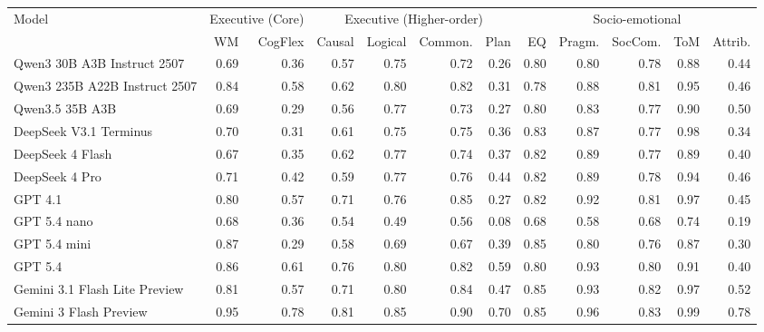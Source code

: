 \begin{tabular}{l r r r r r r r r r r r}
\toprule
\multirow{2}{*}{Model} & \multicolumn{2}{c}{Executive (Core)} & \multicolumn{4}{c}{Executive (Higher-order)} & \multicolumn{5}{c}{Socio-emotional} \\
\cmidrule(lr){2-3}\cmidrule(lr){4-7}\cmidrule(l){8-12}
 & WM & CogFlex & Causal & Logical & Common. & Plan & EQ & Pragm. & SocCom. & ToM & Attrib. \\
\midrule
Qwen3 30B A3B Instruct 2507 & 0.69 & 0.36 & 0.57 & 0.75 & 0.72 & 0.26 & 0.80 & 0.80 & 0.78 & 0.88 & 0.44 \\
Qwen3 235B A22B Instruct 2507 & 0.84 & 0.58 & 0.62 & 0.80 & 0.82 & 0.31 & 0.78 & 0.88 & 0.81 & 0.95 & 0.46 \\
Qwen3.5 35B A3B & 0.69 & 0.29 & 0.56 & 0.77 & 0.73 & 0.27 & 0.80 & 0.83 & 0.77 & 0.90 & 0.50 \\
DeepSeek V3.1 Terminus & 0.70 & 0.31 & 0.61 & 0.75 & 0.75 & 0.36 & 0.83 & 0.87 & 0.77 & 0.98 & 0.34 \\
DeepSeek 4 Flash & 0.67 & 0.35 & 0.62 & 0.77 & 0.74 & 0.37 & 0.82 & 0.89 & 0.77 & 0.89 & 0.40 \\
DeepSeek 4 Pro & 0.71 & 0.42 & 0.59 & 0.77 & 0.76 & 0.44 & 0.82 & 0.89 & 0.78 & 0.94 & 0.46 \\
GPT 4.1 & 0.80 & 0.57 & 0.71 & 0.76 & 0.85 & 0.27 & 0.82 & 0.92 & 0.81 & 0.97 & 0.45 \\
GPT 5.4 nano & 0.68 & 0.36 & 0.54 & 0.49 & 0.56 & 0.08 & 0.68 & 0.58 & 0.68 & 0.74 & 0.19 \\
GPT 5.4 mini & 0.87 & 0.29 & 0.58 & 0.69 & 0.67 & 0.39 & 0.85 & 0.80 & 0.76 & 0.87 & 0.30 \\
GPT 5.4 & 0.86 & 0.61 & 0.76 & 0.80 & 0.82 & 0.59 & 0.80 & 0.93 & 0.80 & 0.91 & 0.40 \\
Gemini 3.1 Flash Lite Preview & 0.81 & 0.57 & 0.71 & 0.80 & 0.84 & 0.47 & 0.85 & 0.93 & 0.82 & 0.97 & 0.52 \\
Gemini 3 Flash Preview & 0.95 & 0.78 & 0.81 & 0.85 & 0.90 & 0.70 & 0.85 & 0.96 & 0.83 & 0.99 & 0.78 \\
\bottomrule
\end{tabular}
